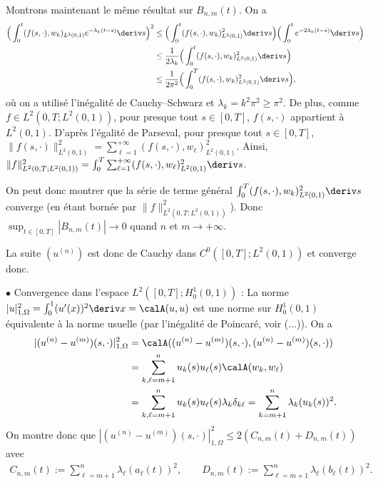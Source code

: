 \documentclass[12pt,a4paper,twoside]{article}
\begin{document}
Montrons maintenant le m\^eme r\'esultat sur $B_{n,m}(t)$.
On a 
\begin{align*}
  \Big( \int_0^t (f(s,\cdot) , w_k)_{L^2(0,1)} e^{- \lambda_k (t-s)} \deriv s \Big)^2
  & \leq \Big( \int_0^t (f(s,\cdot) , w_k)_{L^2(0,1)}^2\deriv s \Big)
  \Big( \int_0^t e^{- 2 \lambda_k (t-s)} \deriv s \Big)
  \\
  & \leq \dfrac{1}{2 \lambda_k} \Big( \int_0^t (f(s,\cdot) , w_k)_{L^2(0,1)}^2\deriv s \Big)
  \\
  & \leq \dfrac{1}{2 \pi^2} \Big( \int_0^T (f(s,\cdot) , w_k)_{L^2(0,1)}^2\deriv s \Big) ,
\end{align*}
o\`u on a utilis\'e l'in\'egalit\'e de Cauchy--Schwarz et $\lambda_k = k^2 \pi^2 \geq \pi^2$.
De plus, comme $f \in L^2(0,T;L^2(0,1))$, pour presque tout $s \in [0,T]$,
$f(s,\cdot)$ appartient \`a $L^2(0,1)$. D'apr\`es l'\'egalit\'e de Parseval,
pour presque tout $s \in [0,T]$, 
$\| f(s,\cdot) \|_{L^2(0,1)}^2 = \sum_{\ell=1}^{+\infty} (f(s,\cdot) , w_{\ell})_{L^2(0,1)}^2$.
Ainsi, $\| f \|_{L^2(0,T;L^2(0,1))}^2 
= \int_0^T \sum_{\ell=1}^{+\infty} (f(s,\cdot) , w_{\ell})_{L^2(0,1)}^2 \deriv s$.

On peut donc montrer que la s\'erie de terme g\'en\'eral 
$\int_0^T (f(s,\cdot) , w_k)_{L^2(0,1)}^2\deriv s$ converge
(en \'etant born\'ee par $\| f \|_{L^2(0,T;L^2(0,1))}^2$).
Donc $\sup_{t \in [0,T]} |B_{n,m}(t)| \to 0$ quand $n$ et $m \to + \infty$. 


La suite $(u^{(n)})$ est donc de Cauchy dans $C^0([0,T];L^2(0,1))$
et converge donc.

$\bullet$ Convergence dans l'espace $L^2([0,T];H_0^1(0,1))$ :
La norme 
$|u|_{1,\Omega}^2 = \int_0^1 (u'(x))^2 \deriv x = \calA(u,u)$
est une norme sur $H^1_0(0,1)$ \'equivalente \`a la norme usuelle
(par l'in\'egalit\'e de Poincar\'e, voir (...)).
On a 
\begin{align*}
  | (u^{(n)} - u^{(m)})(s,\cdot)|_{1,\Omega}^2
  &= \calA((u^{(n)} - u^{(m)})(s,\cdot), (u^{(n)} - u^{(m)})(s,\cdot))
  \\
  &= \sum_{k,\ell = m+1}^n u_k(s) u_{\ell}(s) \calA(w_k , w_{\ell})
  \\
  &= \sum_{k,\ell = m+1}^n u_k(s) u_{\ell}(s) \lambda_k \delta_{k \ell}
  = \sum_{k = m+1}^n \lambda_k (u_k(s))^2 .
\end{align*}
On montre donc que 
$| (u^{(n)} - u^{(m)})(s,\cdot)|_{1,\Omega}^2 \leq 2 (C_{n,m}(t) + D_{n,m}(t))$
avec
\begin{align*}
  C_{n,m}(t) := \sum_{\ell=m+1}^n \lambda_{\ell} (a_{\ell}(t))^2 , \qquad
  D_{n,m}(t) := \sum_{\ell=m+1}^n \lambda_{\ell} (b_{\ell}(t))^2 .
\end{align*}
\end{document}
